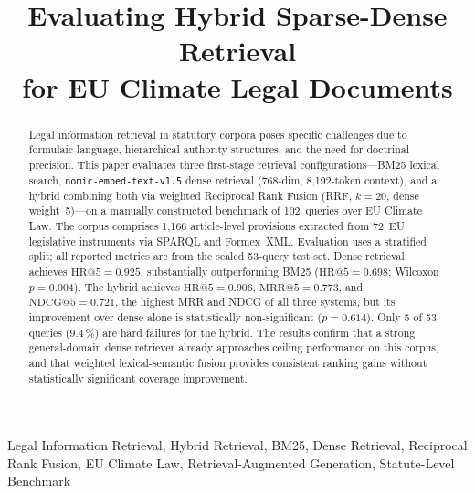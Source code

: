 \documentclass[conference]{IEEEtran}
\makeatletter
\newcommand{\nomic}{\texttt{nomic-embed-text-v1.5}\xspace}
\newcommand{\HR}[1]{\mathrm{HR}@{#1}}
\newcommand{\MRR}[1]{\mathrm{MRR}@{#1}}
\newcommand{\NDCG}[1]{\mathrm{NDCG}@{#1}}
\makeatother
\begin{document}
\title{Evaluating Hybrid Sparse-Dense Retrieval\\
for EU Climate Legal Documents}

\author{
  \and
}

\maketitle

\begin{abstract}
Legal information retrieval in statutory corpora poses specific
challenges due to formulaic language, hierarchical authority structures,
and the need for doctrinal precision.
This paper evaluates three first-stage retrieval configurations---BM25
lexical search, \nomic dense retrieval (768-dim,
8{,}192-token context), and a hybrid combining both via weighted
Reciprocal Rank Fusion (RRF, $k{=}20$, dense weight~5)---on a
manually constructed benchmark of 102~queries over EU Climate Law.
The corpus comprises 1{,}166 article-level provisions extracted from
72~EU legislative instruments via SPARQL and Formex~XML.
Evaluation uses a stratified split; all reported metrics are from the
sealed 53-query test set.
Dense retrieval achieves $\HR{5}{=}0.925$, substantially outperforming
BM25 ($\HR{5}{=}0.698$; Wilcoxon $p{=}0.004$).
The hybrid achieves $\HR{5}{=}0.906$, $\MRR{5}{=}0.773$, and
$\NDCG{5}{=}0.721$, the highest MRR and NDCG of all three systems,
but its improvement over dense alone is statistically non-significant
($p{=}0.614$).
Only 5 of 53 queries ($9.4\,\%$) are hard failures for the hybrid.
The results confirm that a strong general-domain dense retriever
already approaches ceiling performance on this corpus, and that
weighted lexical-semantic fusion provides consistent ranking gains
without statistically significant coverage improvement.
\end{abstract}

\begin{IEEEkeywords}
Legal Information Retrieval, Hybrid Retrieval, BM25,
Dense Retrieval, Reciprocal Rank Fusion, EU Climate Law,
Retrieval-Augmented Generation, Statute-Level Benchmark
\end{IEEEkeywords}
\end{document}
